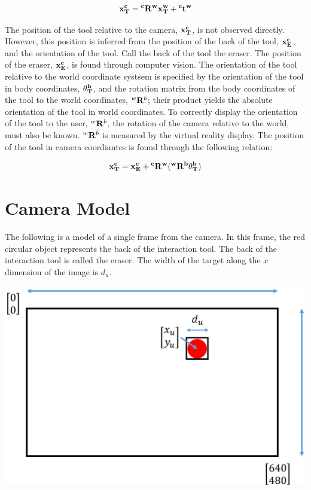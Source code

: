 \documentclass{article}
\newcommand{\xwT}{\bf{x}{^w_T}} %
\newcommand{\xcT}{\bf{x}{^c_T}} %
\newcommand{\xcE}{\bf{x}{^c_E}} %
\newcommand{\obT}{\bf{\theta}{^b_T}} %
\newcommand{\R}[2]{{^#1}{\bf{R}}{^#2}}
\newcommand{\T}[2]{{^#1}{\bf{t}}{^#2}}
\begin{document}
\begin{flushleft}
\[ \xcT = \R{c}{w} \xwT + \T{c}{w} \]

The position of the tool relative to the camera, $ \xcT $, is not observed directly. However, this position is inferred from the position of the back of the tool, $ \xcE $, and the orientation of the tool. Call the back of the tool the eraser. The position of the eraser, $\xcE$, is found through computer vision. The orientation of the tool relative to the world coordinate systsem is specified by the orientation of the tool in body coordinates, $\obT$, and the rotation matrix from the body coordinates of the tool to the world coordinates, $\R{w}{b}$; their product yields the absolute orientation of the tool in world coordinates. To correctly display the orientation of the tool to the user, $\R{w}{b}$, the rotation of the camera relative to the world, must also be known. $\R{w}{b}$ is measured by the virtual reality display. The position of the tool in camera coordiantes is found through the following relation: 

\[ \xcT = \xcE + \R{c}{w}(\R{w}{b}\obT) \]

\medskip
\section{Camera Model}

The following is a model of a single frame from the camera. In this frame, the red circular object represents the back of the interaction tool. The back of the interaction tool is called the eraser. The width of the target along the $x$ dimension of the image is $d_{u}$. 

\medskip

\begin{center}
    \includegraphics[scale=0.4]{computerVision}
\end{center}


\end{flushleft}
\end{document}
